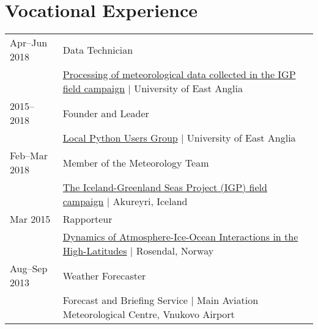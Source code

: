 \documentclass[a4paper, 11pt]{article}
\begin{document}
\section{Vocational Experience}
\begin{tabularx}{\linewidth}{@{}l X@{}}
Apr--Jun 2018 & Data Technician \\ & \href{https://github.com/IGPResearch}{Processing of meteorological data collected in the IGP field campaign} | University of East Anglia \\
2015--2018 & Founder and Leader \\ & \href{https://ueapy.github.io/}{Local Python Users Group} | University of East Anglia \\
Feb--Mar 2018 & Member of the Meteorology Team \\ & \href{https://twitter.com/igpresearch}{The Iceland-Greenland Seas Project (IGP) field campaign} | Akureyri, Iceland \\
Mar 2015 & Rapporteur \\ & \href{https://highlatdynamics.w.uib.no}{Dynamics of Atmosphere-Ice-Ocean Interactions in the High-Latitudes} | Rosendal, Norway \\
Aug--Sep 2013 & Weather Forecaster \\ & Forecast and Briefing Service | Main Aviation Meteorological Centre, Vnukovo Airport \\
\end{tabularx}
\end{document}
